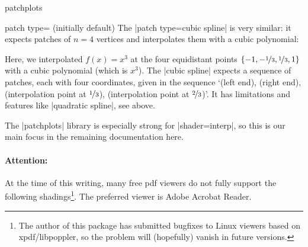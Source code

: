 \begin{pgfplotslibrary}{patchplots}
\begin{pgfplotskey}{patch type= (initially default)}
	The |patch type=cubic spline| is very similar: it expects patches of $n=4$ vertices and interpolates them with a cubic polynomial:
\begin{codeexample}[]
\end{codeexample}
	\noindent Here, we interpolated $f(x)=x^3$ at the four equidistant points $\{-1,-\nicefrac13,\nicefrac13,1\}$ with a cubic polynomial (which is $x^3$). The |cubic spline| expects a sequence of patches, each with four coordinates, given in the sequence `(left end), (right end), (interpolation point at $\nicefrac13$), (interpolation point at $\nicefrac23$)'. It has limitations and features like |quadratic spline|, see above.


	The |patchplots| library is especially strong for |shader=interp|, so this is our main focus in the remaining documentation here.

	\paragraph{Attention:} At the time of this writing, many free pdf viewers do not fully support the following shadings\footnote{The author of this package has submitted bugfixes to Linux viewers based on xpdf/libpoppler, so the problem will (hopefully) vanish in future versions.}. The preferred viewer is Adobe Acrobat Reader.


\end{pgfplotskey}
\end{pgfplotslibrary}
